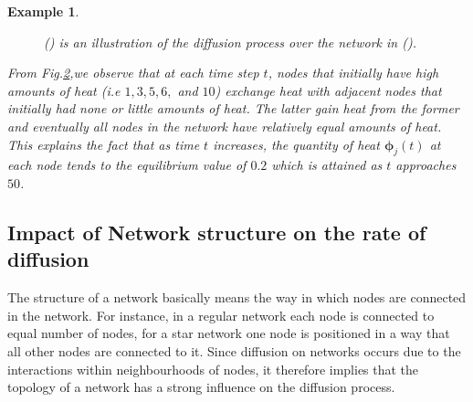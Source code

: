 \documentclass[10pt,a4paper]{article}
\newtheorem{exa}{Example}
\begin{document}
\begin{exa}
\begin{figure}[H]
\begin{subfigure}[b]{0.45\textwidth}
    	 			\caption{}
    	 			\label{difn-plot}
    	 		\end{subfigure}
    	 		\caption{() is an illustration of the diffusion process over the network in (). }
    	 		\label{graph-plot}
    	 	\end{figure}
     	  From Fig.\ref{graph-plot},we observe that at each time step $t$, nodes that initially have high amounts of heat (i.e $1,3,5,6,$ and $10$) exchange heat with adjacent nodes that initially had none or little amounts of heat. The latter gain heat from the former and eventually all nodes in the network have relatively equal amounts of heat. This explains the fact that as time $t$ increases, the quantity of heat $\boldsymbol{\phi}_j(t)$ at each node tends to the equilibrium value of $0.2$ which is attained as $t$ approaches $50$. 
    	 \end{exa}
     
     \subsection{Impact of Network structure on the rate of diffusion}
     The structure of a network basically means the way in which nodes are connected in the network. For instance, in a regular network each node is connected to equal number of nodes, for a star network one node is positioned in a way that all other nodes are connected to it. Since diffusion on networks occurs due to the interactions within neighbourhoods of nodes, it therefore implies that the topology of a network has a strong influence on the diffusion process. 
     
\end{document}
